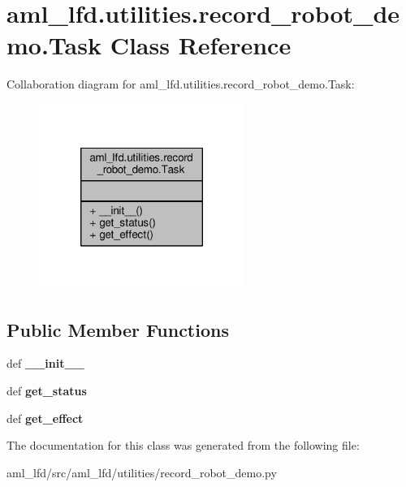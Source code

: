 \hypertarget{classaml__lfd_1_1utilities_1_1record__robot__demo_1_1_task}{\section{aml\-\_\-lfd.\-utilities.\-record\-\_\-robot\-\_\-demo.\-Task Class Reference}
\label{classaml__lfd_1_1utilities_1_1record__robot__demo_1_1_task}
}


Collaboration diagram for aml\-\_\-lfd.\-utilities.\-record\-\_\-robot\-\_\-demo.\-Task\-:
\nopagebreak
\begin{figure}[H]
\begin{center}
\leavevmode
\includegraphics[width=190pt]{classaml__lfd_1_1utilities_1_1record__robot__demo_1_1_task__coll__graph}
\end{center}
\end{figure}
\subsection*{Public Member Functions}
\begin{DoxyCompactItemize}
\item 
\hypertarget{classaml__lfd_1_1utilities_1_1record__robot__demo_1_1_task_a6a473df90cd6f831f722eb229ec77ab4}{def {\bfseries \-\_\-\-\_\-init\-\_\-\-\_\-}}\label{classaml__lfd_1_1utilities_1_1record__robot__demo_1_1_task_a6a473df90cd6f831f722eb229ec77ab4}

\item 
\hypertarget{classaml__lfd_1_1utilities_1_1record__robot__demo_1_1_task_ab85fcc46aa96fe3746fcdedf203a156d}{def {\bfseries get\-\_\-status}}\label{classaml__lfd_1_1utilities_1_1record__robot__demo_1_1_task_ab85fcc46aa96fe3746fcdedf203a156d}

\item 
\hypertarget{classaml__lfd_1_1utilities_1_1record__robot__demo_1_1_task_a5991a4170ea88137b6672c6568e27b8c}{def {\bfseries get\-\_\-effect}}\label{classaml__lfd_1_1utilities_1_1record__robot__demo_1_1_task_a5991a4170ea88137b6672c6568e27b8c}

\end{DoxyCompactItemize}


The documentation for this class was generated from the following file\-:\begin{DoxyCompactItemize}
\item 
aml\-\_\-lfd/src/aml\-\_\-lfd/utilities/record\-\_\-robot\-\_\-demo.\-py\end{DoxyCompactItemize}
